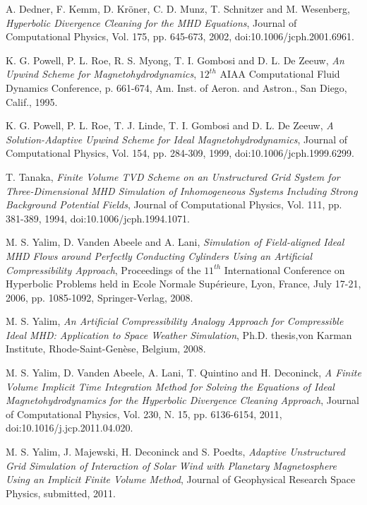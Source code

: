 \documentclass[11pt]{article}
\begin{document}
\begin{thebibliography}{00}
  A. Dedner, F. Kemm, D. Kr\"oner, C. D. Munz, T. Schnitzer and M. Wesenberg,
  {\it Hyperbolic Divergence Cleaning for the MHD Equations},
  Journal of Computational Physics, Vol. 175, pp. 645-673, 2002, doi:10.1006/jcph.2001.6961.

  K. G. Powell, P. L. Roe, R. S. Myong, T. I. Gombosi and D. L. De Zeeuw,
  {\it An Upwind Scheme for Magnetohydrodynamics},
  $12^{th}$ AIAA Computational Fluid Dynamics Conference, p. 661-674, Am. Inst. of Aeron. and Astron., San Diego, Calif., 1995.

  K. G. Powell, P. L. Roe, T. J. Linde, T. I. Gombosi and D. L. De Zeeuw,
  {\it A Solution-Adaptive Upwind Scheme for Ideal Magnetohydrodynamics},
  Journal of Computational Physics, Vol. 154, pp. 284-309, 1999, doi:10.1006/jcph.1999.6299.

  T. Tanaka, {\it Finite Volume TVD Scheme on an Unstructured Grid System for Three-Dimensional MHD Simulation of Inhomogeneous Systems Including Strong Background Potential Fields},
  Journal of Computational Physics, Vol. 111, pp. 381-389, 1994, doi:10.1006/jcph.1994.1071.

  M. S. Yalim, D. Vanden Abeele and A. Lani, 
  {\it Simulation of Field-aligned Ideal MHD Flows around Perfectly Conducting Cylinders Using an Artificial Compressibility Approach}, 
  Proceedings of the $11^{th}$ International Conference on Hyperbolic Problems held in Ecole Normale Sup\'erieure, Lyon, France, July 17-21, 2006, pp. 1085-1092, Springer-Verlag, 2008.

  M. S. Yalim, {\it An Artificial Compressibility Analogy Approach for Compressible Ideal MHD: Application to Space Weather Simulation},
  Ph.D. thesis,von Karman Institute, Rhode-Saint-Gen\`ese, Belgium, 2008.

  M. S. Yalim, D. Vanden Abeele, A. Lani, T. Quintino and H. Deconinck,
  {\it A Finite Volume Implicit Time Integration Method for Solving the Equations of Ideal Magnetohydrodynamics for the Hyperbolic Divergence Cleaning Approach},
  Journal of Computational Physics, Vol. 230, N. 15, pp. 6136-6154, 2011, doi:10.1016/j.jcp.2011.04.020.

  M. S. Yalim, J. Majewski, H. Deconinck and S. Poedts,
  {\it Adaptive Unstructured Grid Simulation of Interaction of Solar Wind with Planetary Magnetosphere Using an Implicit Finite Volume Method},
  Journal of Geophysical Research Space Physics, submitted, 2011.
  
\end{thebibliography}
\end{document}
